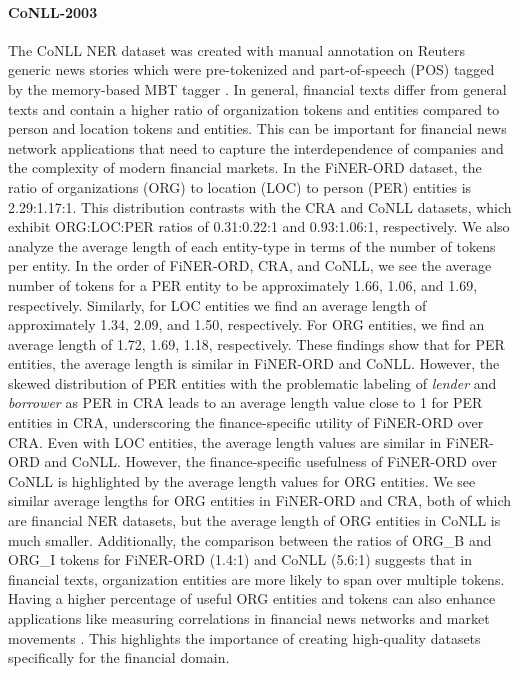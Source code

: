 \documentclass[11pt]{article}
\begin{document}

\paragraph{CoNLL-2003}
The CoNLL NER dataset \citep{sang2003introduction} was created with manual annotation on Reuters generic news stories which were pre-tokenized and part-of-speech (POS) tagged by the memory-based MBT tagger \citep{daelemans2002memorybasedtagger}. In general, financial texts differ from general texts and contain a higher ratio of organization tokens and entities compared to person and location tokens and entities. This can be important for financial news network applications that need to capture the interdependence of companies and the complexity of modern financial markets. In the FiNER-ORD dataset, the ratio of organizations (ORG) to location (LOC) to person (PER) entities is 2.29:1.17:1. This distribution contrasts with the CRA and CoNLL datasets, which exhibit ORG:LOC:PER ratios of 0.31:0.22:1 and 0.93:1.06:1, respectively. We also analyze the average length of each entity-type in terms of the number of tokens per entity. In the order of FiNER-ORD, CRA, and CoNLL, we see the average number of tokens for a PER entity to be approximately 1.66, 1.06, and 1.69, respectively. Similarly, for LOC entities we find an average length of approximately 1.34, 2.09, and 1.50, respectively. For ORG entities, we find an average length of 1.72, 1.69, 1.18, respectively. These findings show that for PER entities, the average length is similar in FiNER-ORD and CoNLL. However, the skewed distribution of PER entities with the problematic labeling of \textit{lender} and \textit{borrower} as PER in CRA leads to an average length value close to 1 for PER entities in CRA, underscoring the finance-specific utility of FiNER-ORD over CRA. Even with LOC entities, the average length values are similar in FiNER-ORD and CoNLL. However, the finance-specific usefulness of FiNER-ORD over CoNLL is highlighted by the average length values for ORG entities. We see similar average lengths for ORG entities in FiNER-ORD and CRA, both of which are financial NER datasets, but the average length of ORG entities in CoNLL is much smaller. Additionally, the comparison between the ratios of ORG\_B and ORG\_I tokens for FiNER-ORD (1.4:1) and CoNLL (5.6:1) suggests that in financial texts, organization entities are more likely to span over multiple tokens. Having a higher percentage of useful ORG entities and tokens can also enhance applications like measuring correlations in financial news networks and market movements \citep{wan2021sentiment}. This highlights the importance of creating high-quality datasets specifically for the financial domain.
\end{document}
